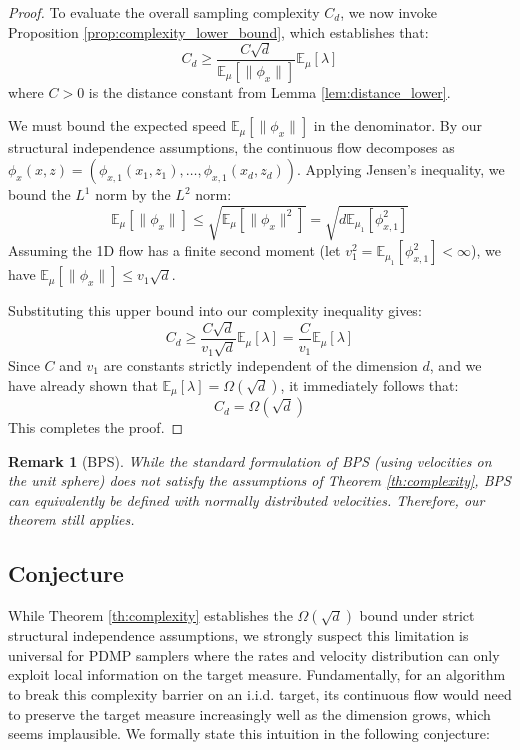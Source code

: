 \documentclass{article}
\newtheorem{remark}{Remark}
\begin{document}
\begin{proof}
        To evaluate the overall sampling complexity $C_d$, we now invoke Proposition \ref{prop:complexity_lower_bound}, which establishes that:
    \[
        C_d \geq \frac{C \sqrt{d}}{\mathbb{E}_\mu[\|\phi_x\|]} \mathbb{E}_\mu[\lambda]
    \]
    where $C > 0$ is the distance constant from Lemma \ref{lem:distance_lower}. 
    
    We must bound the expected speed $\mathbb{E}_\mu[\|\phi_x\|]$ in the denominator. By our structural independence assumptions, the continuous flow decomposes as $\phi_x(x,z) = (\phi_{x,1}(x_1,z_1), \dots, \phi_{x,1}(x_d,z_d))$. Applying Jensen's inequality, we bound the $L^1$ norm by the $L^2$ norm:
    \[
        \mathbb{E}_\mu[\|\phi_x\|] \le \sqrt{\mathbb{E}_\mu[\|\phi_x\|^2]}  = \sqrt{d \mathbb{E}_{\mu_1}[\phi_{x,1}^2]}
    \]
    Assuming the 1D flow has a finite second moment (let $v_1^2 = \mathbb{E}_{\mu_1}[\phi_{x,1}^2] < \infty$), we have $\mathbb{E}_\mu[\|\phi_x\|] \le v_1 \sqrt{d}$.
    
    Substituting this upper bound into our complexity inequality gives:
    \[
        C_d \geq \frac{C \sqrt{d}}{v_1 \sqrt{d}} \mathbb{E}_\mu[\lambda] = \frac{C}{v_1} \mathbb{E}_\mu[\lambda]
    \]
    Since $C$ and $v_1$ are constants strictly independent of the dimension $d$, and we have already shown that $\mathbb{E}_\mu[\lambda] = \Omega(\sqrt{d})$, it immediately follows that:
    \[
        C_d = \Omega(\sqrt{d})
    \]
    This completes the proof.
\end{proof}


\begin{remark}[BPS]
    While the standard formulation of BPS (using velocities on the unit sphere) does not satisfy the assumptions of Theorem \ref{th:complexity}, BPS can equivalently be defined with normally distributed velocities. Therefore, our theorem still applies.
\end{remark}

\subsection{Conjecture}

While Theorem \ref{th:complexity} establishes the $\Omega(\sqrt{d})$ bound under strict structural independence assumptions, we strongly suspect this limitation is universal for PDMP samplers where the rates and velocity distribution can only exploit local information on the target measure. Fundamentally, for an algorithm to break this complexity barrier on an i.i.d. target, its continuous flow would need to preserve the target measure increasingly well as the dimension grows, which seems implausible. We formally state this intuition in the following conjecture:
\end{document}
